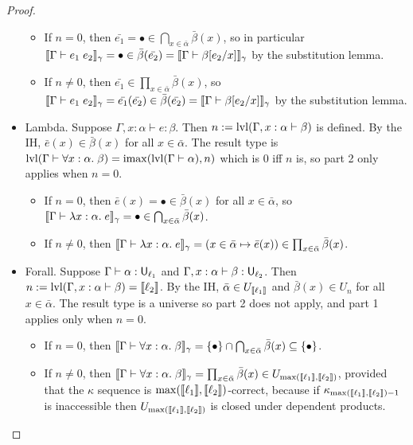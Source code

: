 \begin{proof}
\begin{itemize}
\begin{itemize}
\item If $n=0$, then $\bar{e_1}=\bullet\in\bigcap_{x\in \bar\alpha}\bar\beta(x)$, so in particular $\scott{\Gamma\vdash e_1\;e_2}_\gamma=\bullet\in\bar\beta(\bar{e_2})=\scott{\Gamma\vdash\beta[e_2/x]}_\gamma$ by the substitution lemma.
\item If $n\ne 0$, then $\bar{e_1}\in\prod_{x\in \bar\alpha}\bar\beta(x)$, so $\scott{\Gamma\vdash e_1\;e_2}_\gamma=\bar{e_1}(\bar{e_2})\in\bar\beta(\bar{e_2})=\scott{\Gamma\vdash\beta[e_2/x]}_\gamma$ by the substitution lemma.
\end{itemize}
\item Lambda. Suppose $\Gamma,x:\alpha\vdash e:\beta$. Then $n:=\lvl(\Gamma,x:\alpha\vdash\beta)$ is defined. By the IH, $\bar e(x)\in\bar\beta(x)$ for all $x\in\bar\alpha$. The result type is $\lvl(\Gamma\vdash\forall x:\alpha.\;\beta)=\imax(\lvl(\Gamma\vdash\alpha),n)$ which is $0$ iff $n$ is, so part 2 only applies when $n=0$.
\begin{itemize}
\item If $n=0$, then $\bar e(x)=\bullet\in\bar\beta(x)$ for all $x\in\bar\alpha$, so $\scott{\Gamma\vdash\lambda x:\alpha.\;e}_\gamma=\bullet\in\bigcap_{x\in \bar\alpha}\bar\beta(x)$.
\item If $n\ne 0$, then $\scott{\Gamma\vdash\lambda x:\alpha.\;e}_\gamma=(x\in\bar\alpha\mapsto\bar e(x))\in\prod_{x\in \bar\alpha}\bar\beta(x)$.
\end{itemize}
\item Forall. Suppose $\Gamma\vdash\alpha:\U_{\ell_1}$ and $\Gamma,x:\alpha\vdash\beta:\U_{\ell_2}$. Then $n:=\lvl(\Gamma,x:\alpha\vdash\beta)=\scott{\ell_2}$. By the IH, $\bar\alpha\in U_{\llbracket \ell_1\rrbracket}$ and $\bar\beta(x)\in U_n$ for all $x\in\bar\alpha$. The result type is a universe so part 2 does not apply, and part 1 applies only when $n=0$.
\begin{itemize}
\item If $n=0$, then $\scott{\Gamma\vdash\forall x:\alpha.\;\beta}_\gamma=\{\bullet\}\cap\bigcap_{x\in \bar\alpha}\bar\beta(x)\subseteq\{\bullet\}$.
\item If $n\ne 0$, then $\scott{\Gamma\vdash\forall x:\alpha.\;\beta}_\gamma=\prod_{x\in \bar\alpha}\bar\beta(x)\in U_{\max(\scott{\ell_1},\scott{\ell_2})}$, provided that the $\kappa$ sequence is $\max(\llbracket \ell_1\rrbracket,\llbracket \ell_2\rrbracket)$-correct, because if $\kappa_{\max(\llbracket \ell_1\rrbracket,\llbracket \ell_2\rrbracket)-1}$ is inaccessible then $U_{\max(\llbracket \ell_1\rrbracket,\llbracket \ell_2\rrbracket)}$ is closed under dependent products.

\end{itemize}
\end{itemize}
\end{proof}
